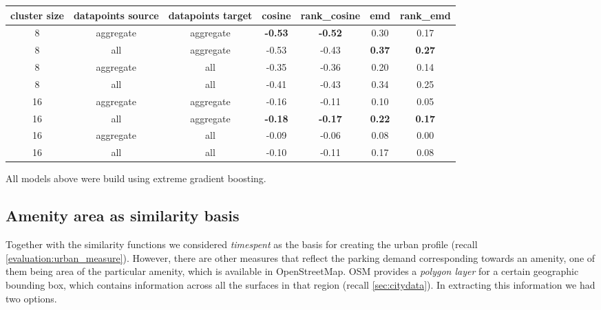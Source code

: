 \begin{table}[!ht]
	{\begin{tabular}{ | c | c | c | c | c | c | c | }
		\hline
		{cluster size} & {datapoints source} & {datapoints target} & cosine & rank\_cosine & emd & rank\_emd \\ \hline
		8	&	aggregate 	&	aggregate 	& 	\textbf{-0.53}	&	\textbf{-0.52}	&	0.30	&	0.17 	\\ \hline
		8	&	all 		&	aggregate 	& 	-0.53	&	-0.43	&	\textbf{0.37}	&	\textbf{0.27}	\\ \hline \hline
		8	&	aggregate 	&	all 		& 	-0.35	&	-0.36	&	0.20	&	0.14	\\ \hline
		8	&	all			& 	all 		&	-0.41	&	-0.43	&	0.34	&	0.25	\\ \hline \hline
		16	&	aggregate	& 	aggregate 	&	-0.16	&	-0.11	&	0.10	&	0.05	\\ \hline
		16	&	all			& 	aggregate 	& 	\textbf{-0.18}	&	\textbf{-0.17}	&	\textbf{0.22}	&	\textbf{0.17}	\\ \hline \hline
		16	&	aggregate	& 	all 		& 	-0.09	&	-0.06	&	0.08	&	0.00	\\ \hline
		16	&	all			&	all 		&	-0.10	&	-0.11	&	0.17	&	0.08	\\ \hline \hline
	\end{tabular}}
	\label{tab:correlation_values}
	\begin{tabnote}
		All models above were build using extreme gradient boosting.
	\end{tabnote}
\end{table}
	
	
\subsection{Amenity area as similarity basis}
\label{extensions:amenity_area}
Together with the similarity functions we considered \textit{timespent} as the basis for creating the urban profile (recall \ref{evaluation:urban_measure}). However, there are other measures that reflect the parking demand corresponding towards an amenity, one of them being area of the particular amenity, which is available in OpenStreetMap. OSM provides a \textit{polygon layer} for a certain geographic bounding box, which contains information across all the surfaces in that region (recall \ref{sec:citydata}). In extracting this information we had two options. 

